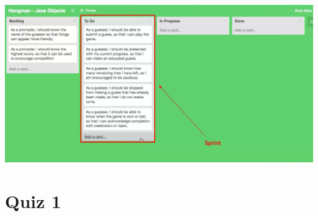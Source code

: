 \documentclass[12pt]{article}
\begin{document}
\begin{itemize}
    \begin{center}
    \includegraphics[width=\linewidth]{images/part_3_notes_3.png}
    \end{center}
\end{itemize}

\bigskip

\section{Quiz 1}

\bigskip
\end{document}
